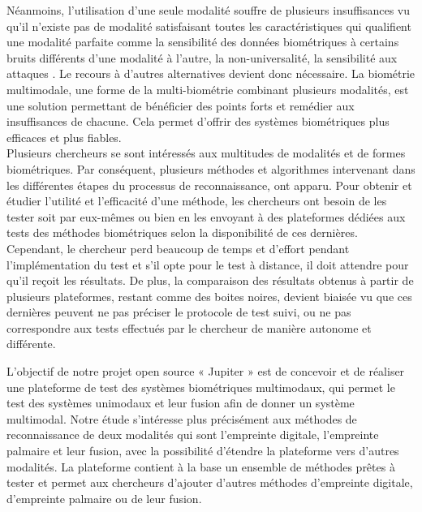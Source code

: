 Néanmoins, l'utilisation d'une seule modalité souffre de plusieurs insuffisances vu qu'il n'existe pas de modalité satisfaisant toutes les caractéristiques qui qualifient une modalité parfaite comme la sensibilité des données biométriques à certains bruits différents d'une modalité à l'autre, la non-universalité, la sensibilité aux attaques . Le recours à d'autres alternatives devient donc nécessaire. La biométrie multimodale, une forme de la multi-biométrie combinant plusieurs modalités, est une solution permettant de bénéficier des points forts et remédier aux insuffisances de chacune. Cela permet d'offrir des systèmes biométriques plus efficaces et plus fiables. \\ \tab
Plusieurs chercheurs se sont intéressés aux multitudes de modalités et de formes biométriques. Par conséquent, plusieurs méthodes et algorithmes intervenant dans les différentes étapes du processus de reconnaissance, ont apparu. Pour obtenir et étudier l'utilité et l'efficacité d'une méthode, les chercheurs ont besoin de les tester soit par eux-mêmes ou bien en les envoyant à des plateformes dédiées aux tests des méthodes biométriques selon la disponibilité de ces dernières. Cependant, le chercheur perd beaucoup de temps et d'effort pendant l'implémentation du test et s'il opte pour le test à distance, il doit attendre pour qu'il reçoit les résultats. De plus, la comparaison des résultats obtenus à partir de plusieurs plateformes, restant comme des boites noires, devient biaisée vu que ces dernières peuvent ne pas préciser le protocole de test suivi, ou ne pas correspondre aux tests effectués par le chercheur de manière autonome et différente.  \\ \tab

L'objectif de notre projet open source « Jupiter » est de concevoir et de réaliser une plateforme de test des systèmes biométriques multimodaux, qui permet le test des systèmes unimodaux et leur fusion afin de donner un système multimodal. Notre étude s'intéresse plus précisément aux méthodes de reconnaissance de deux modalités qui sont l'empreinte digitale, l'empreinte palmaire et leur fusion, avec la possibilité d'étendre la plateforme vers d'autres modalités. La plateforme contient à la base un ensemble de méthodes prêtes à tester et permet aux chercheurs d'ajouter d'autres méthodes d'empreinte digitale, d'empreinte palmaire ou de leur fusion. \\ \tab

